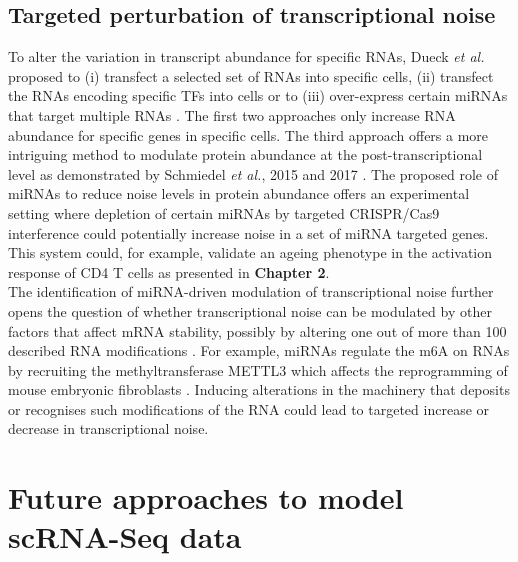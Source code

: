\subsection{Targeted perturbation of transcriptional noise} 

To alter the variation in transcript abundance for specific RNAs, Dueck \emph{et al.} proposed to (i) transfect a selected set of RNAs into specific cells, (ii) transfect the RNAs encoding specific TFs into cells or to (iii) over-express certain miRNAs that target multiple RNAs \cite{Dueck2016}. The first two approaches only increase RNA abundance for specific genes in specific cells. The third approach offers a more intriguing method to modulate protein abundance at the post-transcriptional level as demonstrated by Schmiedel \emph{et al.}, 2015 and 2017 \cite{Schmiedel2015, Schmiedel2017}. The proposed role of miRNAs to reduce noise levels in protein abundance offers an experimental setting where depletion of certain miRNAs by targeted CRISPR/Cas9 interference could potentially increase noise in a set of miRNA targeted genes. This system could, for example, validate an ageing phenotype in the activation response of CD4\plus{} T cells as presented in \textbf{Chapter 2}. \\

The identification of miRNA-driven modulation of transcriptional noise further opens the question of whether transcriptional noise can be modulated by other factors that affect mRNA stability, possibly by altering one out of more than 100 described RNA modifications \citep{Cantara2011}. For example, miRNAs regulate the \gls{m6A} on RNAs by recruiting the methyltransferase METTL3 which affects the reprogramming of mouse embryonic fibroblasts \citep{Chen2015b}. Inducing alterations in the machinery that deposits or recognises such modifications of the RNA could lead to targeted increase or decrease in transcriptional noise.

\newpage

\section{Future approaches to model scRNA-Seq data}

